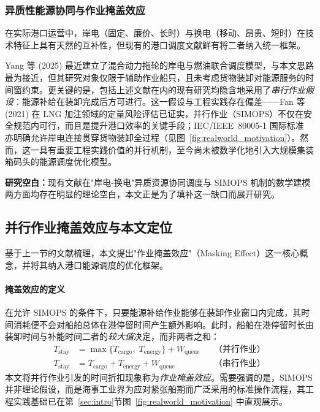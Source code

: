 \documentclass[UTF8, a4paper, 12pt]{ctexart}
\begin{document}
\subsubsection{异质性能源协同与作业掩盖效应}
在实际港口运营中，岸电（固定、廉价、长时）与换电（移动、昂贵、短时）在技术特征上具有天然的互补性，但现有的港口调度文献鲜有将二者纳入统一框架。

Yang 等 (2025) \cite{Yang2025_Hybrid} 最近建立了混合动力拖轮的岸电与燃油联合调度模型，与本文思路最为接近，但其研究对象仅限于辅助作业船只，且未考虑货物装卸对能源服务的时间窗约束。更关键的是，包括上述文献在内的现有研究均隐含地采用了\emph{串行作业假设}：能源补给在装卸完成后方可进行。这一假设与工程实践存在偏差——Fan 等 (2021) \cite{Fan2021} 在 LNG 加注领域的定量风险评估已证实，并行作业（SIMOPS）不仅在安全规范内可行，而且是提升港口效率的关键手段；IEC/IEEE~80005-1 国际标准 \cite{IEC80005} 亦明确允许岸电连接贯穿货物装卸全过程（见图~\ref{fig:realworld_motivation}）。然而，这一具有重要工程实践价值的并行机制，至今尚未被数学化地引入大规模集装箱码头的能源调度优化模型。

\textbf{研究空白：}现有文献在"岸电-换电"异质资源协同调度与 SIMOPS 机制的数学建模两方面均存在明显的理论空白，本文正是为了填补这一缺口而展开研究。

\subsection{并行作业掩盖效应与本文定位}

基于上一节的文献梳理，本文提出"作业掩盖效应"（Masking Effect）这一核心概念，并将其纳入港口能源调度的优化框架。

\paragraph{掩盖效应的定义}
在允许 SIMOPS 的条件下，只要能源补给作业能够在装卸作业窗口内完成，其时间消耗便不会对船舶总体在港停留时间产生额外影响。此时，船舶在港停留时长由装卸时间与补能时间二者的\emph{较大值}决定，而非两者之和：
\begin{equation*}
\begin{aligned}
T_{\text{stay}} &= \max\{T_{\text{cargo}},\; T_{\text{energy}}\} + W_{\text{queue}}
&& \text{（并行作业）} \\
T_{\text{stay}} &= T_{\text{cargo}} + T_{\text{energy}} + W_{\text{queue}}
&& \text{（串行作业）}
\end{aligned}
\end{equation*}
本文将并行作业引发的时间折扣现象称为\emph{作业掩盖效应}。需要强调的是，SIMOPS 并非理论假设，而是海事工业界为应对紧张船期而广泛采用的标准操作流程，其工程实践基础已在第~\ref{sec:intro}节图~\ref{fig:realworld_motivation} 中直观展示。
\end{document}

